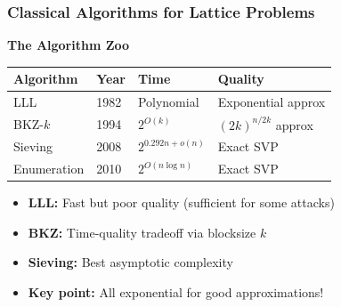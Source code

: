 \documentclass[aspectratio=169,10pt]{beamer}
\newcommand{\teaching}[1]{}
\newcommand{\slideheader}[1]{\frametitle{#1}}
\theoremstyle{plain}
\begin{document}
\begin{frame}
  \slideheader{Classical Algorithms for Lattice Problems}
  
  \begin{center}
    \textbf{\large The Algorithm Zoo}
  \end{center}
  
  \vspace{0.3cm}
  
  \begin{table}
    \centering
    \begin{tabular}{|l|l|l|l|}
      \hline
      \textbf{Algorithm} & \textbf{Year} & \textbf{Time} & \textbf{Quality} \\
      \hline
      LLL & 1982 & Polynomial & Exponential approx \\
      BKZ-$k$ & 1994 & $2^{O(k)}$ & $(2k)^{n/2k}$ approx \\
      Sieving & 2008 & $2^{0.292n + o(n)}$ & Exact SVP \\
      Enumeration & 2010 & $2^{O(n \log n)}$ & Exact SVP \\
      \hline
    \end{tabular}
  \end{table}
  
  \vspace{0.5cm}
  
  \begin{itemize}
    \item \textbf{LLL:} Fast but poor quality (sufficient for some attacks)
    \item \textbf{BKZ:} Time-quality tradeoff via blocksize $k$
    \item \textbf{Sieving:} Best asymptotic complexity
    \item \textbf{Key point:} All exponential for good approximations!
  \end{itemize}
  
  \vspace{0.3cm}
  
  
  \teaching{Establish classical hardness baseline}
\end{frame}
\end{document}
